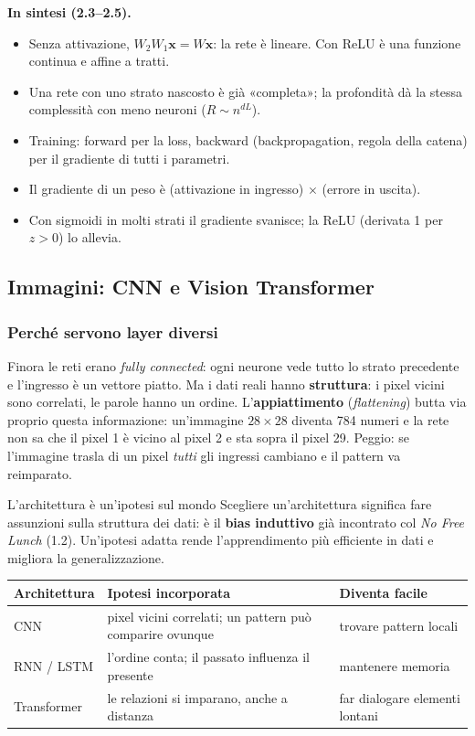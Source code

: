 \documentclass[12pt]{extarticle}
\begin{document}
\noindent\textbf{In sintesi (2.3--2.5).}
\begin{itemize}
    \item Senza attivazione, $W_2W_1\mathbf{x}=W\mathbf{x}$: la rete è lineare. Con ReLU è una funzione continua e affine a tratti.
    \item Una rete con uno strato nascosto è già «completa»; la profondità dà la stessa complessità con meno neuroni ($R\sim n^{dL}$).
    \item Training: forward per la loss, backward (backpropagation, regola della catena) per il gradiente di tutti i parametri.
    \item Il gradiente di un peso è (attivazione in ingresso) $\times$ (errore in uscita).
    \item Con sigmoidi in molti strati il gradiente svanisce; la ReLU (derivata 1 per $z>0$) lo allevia.
\end{itemize}

\subsection{Immagini: CNN e Vision Transformer}

\subsubsection{Perché servono layer diversi}

\noindent Finora le reti erano \emph{fully connected}: ogni neurone vede tutto lo strato precedente e l'ingresso è un vettore piatto. Ma i dati reali hanno \textbf{struttura}: i pixel vicini sono correlati, le parole hanno un ordine. L'\textbf{appiattimento} (\emph{flattening}) butta via proprio questa informazione: un'immagine $28\times28$ diventa 784 numeri e la rete non sa che il pixel 1 è vicino al pixel 2 e sta sopra il pixel 29. Peggio: se l'immagine trasla di un pixel \emph{tutti} gli ingressi cambiano e il pattern va reimparato.

\begin{ideabox}{L'architettura è un'ipotesi sul mondo}
Scegliere un'architettura significa fare assunzioni sulla struttura dei dati: è il \textbf{bias induttivo} già incontrato col \emph{No Free Lunch} (1.2). Un'ipotesi adatta rende l'apprendimento più efficiente in dati e migliora la generalizzazione.
\begin{center}
\small
\begin{tabular}{L{2.4cm}L{5.7cm}L{5cm}}
    \toprule
    \textbf{Architettura} & \textbf{Ipotesi incorporata} & \textbf{Diventa facile} \\
    \midrule
    CNN & pixel vicini correlati; un pattern può comparire ovunque & trovare pattern locali \\
    RNN / LSTM & l'ordine conta; il passato influenza il presente & mantenere memoria \\
    Transformer & le relazioni si imparano, anche a distanza & far dialogare elementi lontani \\
    \bottomrule
\end{tabular}
\end{center}
\end{ideabox}
\end{document}
